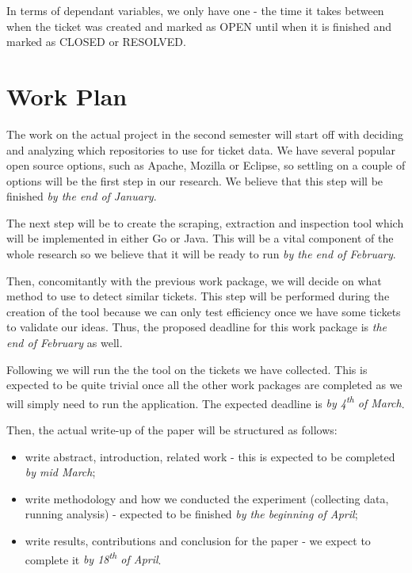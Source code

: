 \documentclass{mprop}
\begin{document}
In terms of dependant variables, we only have one - the time it takes
between when the ticket was created and marked as OPEN until when it
is finished and marked as CLOSED or RESOLVED.

\section{Work Plan}\label{work_plan}

The work on the actual project in the second semester will start off 
with deciding and analyzing which repositories to use for ticket data.
We have several popular open source options, such as Apache, Mozilla or
Eclipse, so settling on a couple of options will be the first step in our
research. We believe that this step will be finished \emph{by the end of
January}.

The next step will be to create the scraping, extraction and inspection
tool which will be implemented in either Go or Java. This will be a vital
component of the whole research so we believe that it will be ready to run
\emph{by the end of February}.

Then, concomitantly with the previous work package, we will decide on
what method to use to detect similar tickets. This step will be performed
during the creation of the tool because we can only test efficiency once
we have some tickets to validate our ideas. Thus, the proposed deadline
for this work package is \emph{the end of February} as well.

Following we will run the the tool on the tickets we have collected. This
is expected to be quite trivial once all the other work packages are 
completed as we will simply need to run the application. The expected
deadline is \emph{by 4\textsuperscript{th} of March}.

Then, the actual write-up of the paper will be structured as follows:
  \begin{itemize}
    \item write abstract, introduction, related work - this is expected
      to be completed \emph{by mid March};
    \item write methodology and how we conducted the experiment (collecting
      data, running analysis) - expected to be finished \emph{by the 
      beginning of April};
    \item write results, contributions and conclusion for the paper - 
      we expect to complete it \emph{by 18\textsuperscript{th} of April}.
  \end{itemize}


\end{document}
